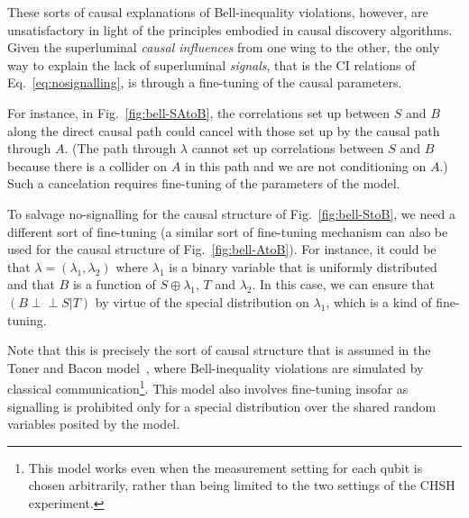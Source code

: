 \documentclass[12pt,onecolumn,nofootinbib]{revtex4-2}
\def\indep{\perp\!\!\!\!\perp}
\begin{document}
 These sorts of causal explanations of Bell-inequality violations, however, are unsatisfactory in light of the principles embodied in causal discovery algorithms.  Given the superluminal \emph{causal influences} from one wing to the other, the only way to explain the lack of superluminal \emph{signals}, that is the CI relations of Eq.~\eqref{eq:nosignalling}, is through a fine-tuning of the causal parameters.\color{black}
 

For instance, in Fig.~\ref{fig:bell-SAtoB}, the correlations set up between $S$ and $B$ along the direct causal path could cancel with those set up by the causal path through $A$. (The path through $\lambda$ cannot set up correlations between $S$ and $B$ because there is a collider on $A$ in this path and we are not conditioning on $A$.) Such a cancelation requires fine-tuning of the parameters of the model.

To salvage no-signalling for the causal structure of Fig.~\ref{fig:bell-StoB}, we need a different sort of fine-tuning (a similar sort of fine-tuning mechanism can also be used for the causal structure of Fig.~\ref{fig:bell-AtoB}).  For instance, it could be that $\lambda=(\lambda_1,\lambda_2)$ where $\lambda_1$ is a binary variable that is uniformly distributed and that $B$ is a function of $S\oplus \lambda_1$, $T$ and $\lambda_2$. In this case, we can ensure that $(B \indep S|T)$ by virtue of the special distribution on $\lambda_1$, which is a kind of fine-tuning.

Note that this is precisely the sort of causal structure that is assumed in the Toner and Bacon model~\cite{TonerBacon2003}, where Bell-inequality violations are simulated by classical communication\footnote{This model works even when the measurement setting for each qubit is chosen arbitrarily, rather than being limited to the two settings of the CHSH experiment.}. This model also involves fine-tuning insofar as signalling is prohibited only for a special distribution over the shared random variables posited by the model.
\end{document}
